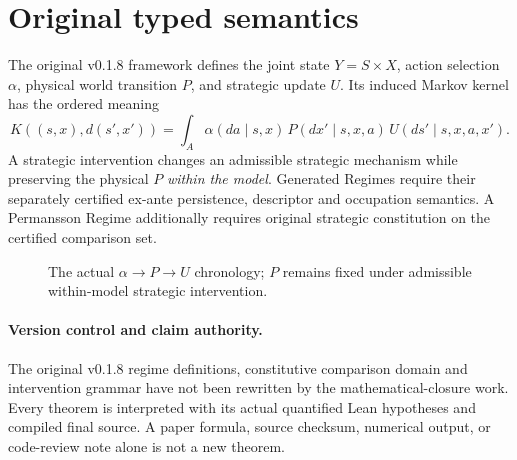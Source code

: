 \section{Original typed semantics}
The original v0.1.8 framework \citep{PRT2026} defines the joint state
$Y=S\times X$, action selection $\alpha$, physical world transition $P$,
and strategic update $U$. Its induced Markov kernel has the ordered meaning
\[
K((s,x),d(s',x'))=
\int_A\alpha(da\mid s,x)\,P(dx'\mid s,x,a)\,
U(ds'\mid s,x,a,x').
\]
A strategic intervention changes an admissible strategic mechanism while
preserving the physical $P$ \emph{within the model}. Generated Regimes
require their separately certified ex-ante persistence, descriptor and
occupation semantics. A Permansson Regime additionally requires original
strategic constitution on the certified comparison set.
\begin{figure}[htbp]\centering
{}
\caption{The actual $\alpha\to P\to U$ chronology; $P$ remains fixed
under admissible within-model strategic intervention.}
\end{figure}


\paragraph{Version control and claim authority.}
The original v0.1.8 regime definitions, constitutive comparison domain and
intervention grammar have not been rewritten by the mathematical-closure
work. Every theorem is interpreted with its actual quantified Lean
hypotheses and compiled final source. A paper formula, source checksum,
numerical output, or code-review note alone is not a new theorem.
